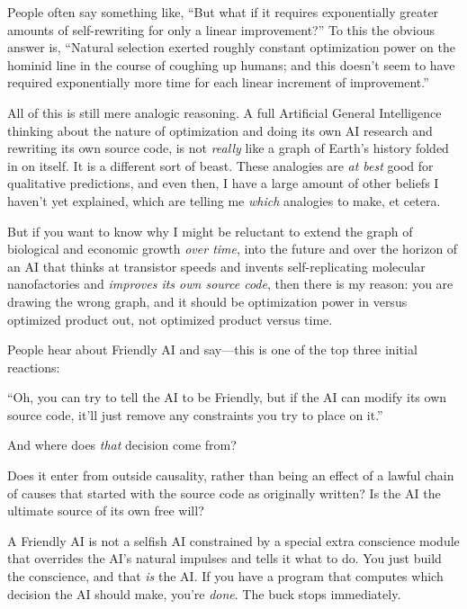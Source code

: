 {
 People often say something like, ``But what if it
requires exponentially greater amounts of self-rewriting for only a
linear improvement?'' To this the obvious answer is,
``Natural selection exerted roughly constant
optimization power on the hominid line in the course of coughing up
humans; and this doesn't seem to have required
exponentially more time for each linear increment of
improvement.''}

{
 All of this is still mere analogic reasoning. A full Artificial
General Intelligence thinking about the nature of optimization and
doing its own AI research and rewriting its own source code, is not
\textit{really} like a graph of Earth's history folded
in on itself. It is a different sort of beast. These analogies are
\textit{at best} good for qualitative predictions, and even then, I
have a large amount of other beliefs I haven't yet
explained, which are telling me \textit{which} analogies to make, et
cetera.}

{
 But if you want to know why I might be reluctant to extend the
graph of biological and economic growth \textit{over time}, into the
future and over the horizon of an AI that thinks at transistor speeds
and invents self-replicating molecular nanofactories and
\textit{improves its own source code}, then there is my reason: you are
drawing the wrong graph, and it should be optimization power in versus
optimized product out, not optimized product versus time.}

\myendsectiontext


{
 People hear about Friendly AI and say---this is one of the top
three initial reactions: }

{
 ``Oh, you can try to tell the AI to be Friendly,
but if the AI can modify its own source code, it'll
just remove any constraints you try to place on
it.''}

{
 And where does \textit{that} decision come from?}

{
 Does it enter from outside causality, rather than being an effect
of a lawful chain of causes that started with the source code as
originally written? Is the AI the ultimate source of its own free
will?}

{
 A Friendly AI is not a selfish AI constrained by a special extra
conscience module that overrides the AI's natural
impulses and tells it what to do. You just build the conscience, and
that \textit{is} the AI. If you have a program that computes which
decision the AI should make, you're \textit{done}. The
buck stops immediately.}


